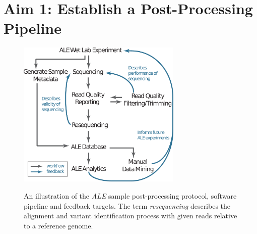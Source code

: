 \documentclass[12pt,final,masters,chapterheads]{ucsd}  %
\begin{document}



\chapter{Aim 1: Establish a Post-Processing Pipeline}


\begin{figure}[h!]
  \caption{An illustration of the \textit{ALE} sample post-processing protocol, software pipeline and feedback targets. The term \textit{resequencing} describes the alignment and variant identification process with given reads relative to a reference genome.}
  \centering
  \includegraphics[width=0.7\textwidth]{post_processing_protocol.png}
  \label{fig:post_processing_protocol}
\end{figure}
\end{document}
